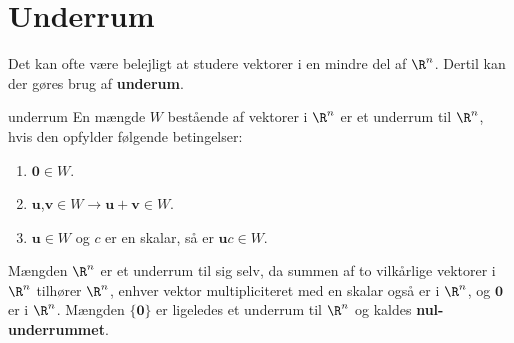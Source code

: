 \section{Underrum}
Det kan ofte være belejligt at studere vektorer i en mindre del af $\R^n$. Dertil kan der gøres brug af \textbf{underum}.
\begin{defn}{}{underrum}
En mængde $W$ bestående af vektorer i $\R^n$ er et underrum til $\R^n$, hvis den opfylder følgende betingelser:	
\begin{enumerate}[label=(\alph*)]
	\item $\textbf{0}\in W$.
	\item $\textbf{u}$,$\textbf{v} \in W \rightarrow \textbf{u}+\textbf{v} \in W $.
	\item $\textbf{u} \in W$ og $c$ er en skalar, så er $\textbf{u}c \in W$.
\end{enumerate}
\end{defn}
\noindent
Mængden $\R^n$ er et underrum til sig selv, da summen af to vilkårlige vektorer i $\R^n$ tilhører $\R^n$, enhver vektor multipliciteret med en skalar også er i $\R^n$, og $\textbf{0}$ er i $\R^n$. Mængden $\{\textbf{0}\}$ er ligeledes et underrum til $\R^n$ og kaldes \textbf{nul-underrummet}.


